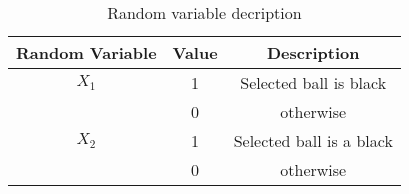 \begin{table}[H]
\centering
\def\arraystretch{1.5}
\begin{tabular}{|c|c|c|}
\hline
\textbf{Random Variable} & \textbf{Value} & \textbf{Description} \\ \hline 
$X_1$ & 1 & Selected ball is black \\ \hhline{~--}
& 0 & otherwise \\ \hline
$X_2$ & 1 & Selected ball is a black \\ \hhline{~--}
& 0 & otherwise \\ \hline
\end{tabular}
\label{tab: table 1}
\caption{Random variable decription}
\end{table}

